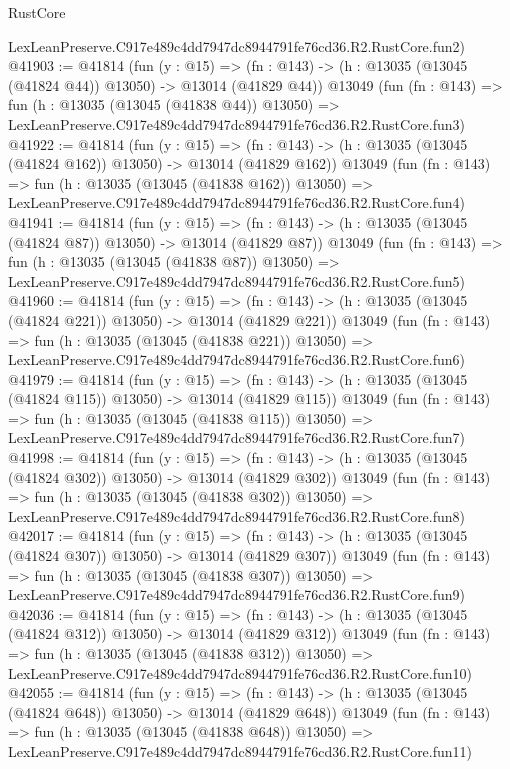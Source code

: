 \begin{lexlean}{RustCore}
\begin{coremodule}
    LexLeanPreserve.C917e489c4dd7947dc8944791fe76cd36.R2.RustCore.fun2)
@41903 := @41814
    (fun (y : @15) =>
    (fn : @143) -> (h : @13035 (@13045 (@41824 @44)) @13050) -> @13014 (@41829 @44))
    @13049
    (fun (fn : @143) =>
    fun (h : @13035 (@13045 (@41838 @44)) @13050) =>
    LexLeanPreserve.C917e489c4dd7947dc8944791fe76cd36.R2.RustCore.fun3)
@41922 := @41814
    (fun (y : @15) =>
    (fn : @143) -> (h : @13035 (@13045 (@41824 @162)) @13050) -> @13014 (@41829 @162))
    @13049
    (fun (fn : @143) =>
    fun (h : @13035 (@13045 (@41838 @162)) @13050) =>
    LexLeanPreserve.C917e489c4dd7947dc8944791fe76cd36.R2.RustCore.fun4)
@41941 := @41814
    (fun (y : @15) =>
    (fn : @143) -> (h : @13035 (@13045 (@41824 @87)) @13050) -> @13014 (@41829 @87))
    @13049
    (fun (fn : @143) =>
    fun (h : @13035 (@13045 (@41838 @87)) @13050) =>
    LexLeanPreserve.C917e489c4dd7947dc8944791fe76cd36.R2.RustCore.fun5)
@41960 := @41814
    (fun (y : @15) =>
    (fn : @143) -> (h : @13035 (@13045 (@41824 @221)) @13050) -> @13014 (@41829 @221))
    @13049
    (fun (fn : @143) =>
    fun (h : @13035 (@13045 (@41838 @221)) @13050) =>
    LexLeanPreserve.C917e489c4dd7947dc8944791fe76cd36.R2.RustCore.fun6)
@41979 := @41814
    (fun (y : @15) =>
    (fn : @143) -> (h : @13035 (@13045 (@41824 @115)) @13050) -> @13014 (@41829 @115))
    @13049
    (fun (fn : @143) =>
    fun (h : @13035 (@13045 (@41838 @115)) @13050) =>
    LexLeanPreserve.C917e489c4dd7947dc8944791fe76cd36.R2.RustCore.fun7)
@41998 := @41814
    (fun (y : @15) =>
    (fn : @143) -> (h : @13035 (@13045 (@41824 @302)) @13050) -> @13014 (@41829 @302))
    @13049
    (fun (fn : @143) =>
    fun (h : @13035 (@13045 (@41838 @302)) @13050) =>
    LexLeanPreserve.C917e489c4dd7947dc8944791fe76cd36.R2.RustCore.fun8)
@42017 := @41814
    (fun (y : @15) =>
    (fn : @143) -> (h : @13035 (@13045 (@41824 @307)) @13050) -> @13014 (@41829 @307))
    @13049
    (fun (fn : @143) =>
    fun (h : @13035 (@13045 (@41838 @307)) @13050) =>
    LexLeanPreserve.C917e489c4dd7947dc8944791fe76cd36.R2.RustCore.fun9)
@42036 := @41814
    (fun (y : @15) =>
    (fn : @143) -> (h : @13035 (@13045 (@41824 @312)) @13050) -> @13014 (@41829 @312))
    @13049
    (fun (fn : @143) =>
    fun (h : @13035 (@13045 (@41838 @312)) @13050) =>
    LexLeanPreserve.C917e489c4dd7947dc8944791fe76cd36.R2.RustCore.fun10)
@42055 := @41814
    (fun (y : @15) =>
    (fn : @143) -> (h : @13035 (@13045 (@41824 @648)) @13050) -> @13014 (@41829 @648))
    @13049
    (fun (fn : @143) =>
    fun (h : @13035 (@13045 (@41838 @648)) @13050) =>
    LexLeanPreserve.C917e489c4dd7947dc8944791fe76cd36.R2.RustCore.fun11)

\end{coremodule}
\end{lexlean}
